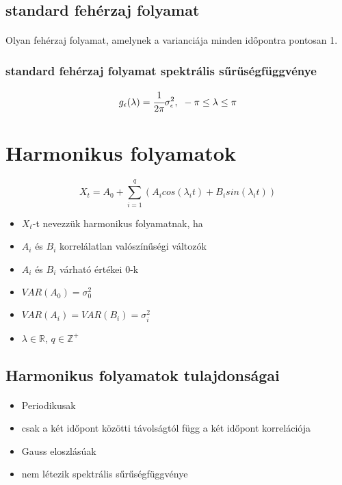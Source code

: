 \documentclass[11pt,a4paper]{article}
\begin{document}
			\subsection{standard fehérzaj folyamat}
				\paragraph{}
					Olyan fehérzaj folyamat, amelynek a varianciája minden időpontra pontosan 1.
			\subsubsection{standard fehérzaj folyamat spektrális sűrűségfüggvénye}
				$$g_\epsilon(\lambda) = \cfrac{1}{2 \pi} \sigma^2_\epsilon, \\\ -\pi \le \lambda \le \pi$$
		\section{Harmonikus folyamatok}
			\paragraph{}
				$$X_t = A_0 + \sum_{i=1}^q (A_i cos(\lambda_i t) + B_i sin(\lambda_i t))$$
				\begin{itemize}
					\item $X_t$-t nevezzük harmonikus folyamatnak, ha
					\item $A_i$ és $B_i$ korrelálatlan valószínűségi változók
					\item $A_i$ és $B_i$ várható értékei 0-k
					\item $VAR(A_0) = \sigma_0^2$
					\item $VAR(A_i)= VAR(B_i) = \sigma_i^2$
					\item $\lambda \in \mathbb{R}$, $q \in \mathbb{Z}^+$
				\end{itemize}
			\subsection{Harmonikus folyamatok tulajdonságai}
				\paragraph{}
					\begin{itemize}
						\item Periodikusak
						\item csak a két időpont közötti távolságtól függ a két időpont korrelációja
						\item Gauss eloszlásúak
						\item nem létezik spektrális sűrűségfüggvénye
					\end{itemize}
\end{document}
